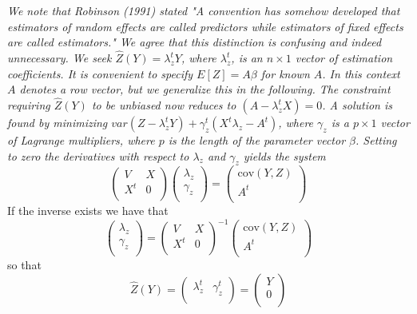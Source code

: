\documentclass[Main.tex]{subfiles}
\begin{document}
	\emph{We note that Robinson (1991) stated "A convention has somehow developed that estimators of random effects are called predictors while estimators of fixed effects are called estimators." We agree that this distinction is confusing and indeed unnecessary. We seek $\hat{Z}(Y) = \lambda_{z}^{t}Y$, where $ \lambda_{z}^{t}$, is an $n \times 1$ vector of estimation coefficients. It is convenient to specify $E[Z]=A\beta$ for known $A$. In this context $A$ denotes a row vector, but we generalize this in the following. The constraint requiring $\hat{Z}(Y)$ to be unbiased now reduces to $(A -  \lambda_{z}^{t}X) = 0$. A solution is found by minimizing $var(Z -  \lambda_{z}^{t}Y) + \gamma^t_z (X^t\lambda_{z} - A^t)$, where $\gamma_z$ is a $p \times 1$ vector of Lagrange multipliers, where $p$ is the length of the parameter vector $\beta$. Setting to zero the derivatives with respect to $\lambda_{z}$ and $\gamma_z $ yields the system}
	\[
	\left(
	\begin{array}{cc}
	V & X \\
	X^t & 0 \\
	\end{array}
	\right)\left(
	\begin{array}{c}
	\lambda_{z}\\
	\gamma_z \\
	\end{array}
	\right)=\left(
	\begin{array}{c}
	\mbox{cov}(Y,Z)\\
	A^{t} \\
	\end{array}
	\right)
	\]
	If the inverse exists we have that
	\[
	\left(
	\begin{array}{c}
	\lambda_{z}\\
	\gamma_z \\
	\end{array}
	\right)=\left(
	\begin{array}{cc}
	V & X \\
	X^t & 0 \\
	\end{array}
	\right) ^{-1}\left(
	\begin{array}{c}
	\mbox{cov}(Y,Z)\\
	A^{t} \\
	\end{array}
	\right)
	\]
	so that 
	\[ \hat{Z}(Y) = \left(
	\begin{array}{cc}
	\lambda_{z}^{t}&
	\gamma_z^{t} \\
	\end{array}
	\right)=\left(
	\begin{array}{c}
	Y \\
	0 \\
	\end{array}
	\right) \]
\end{document}
